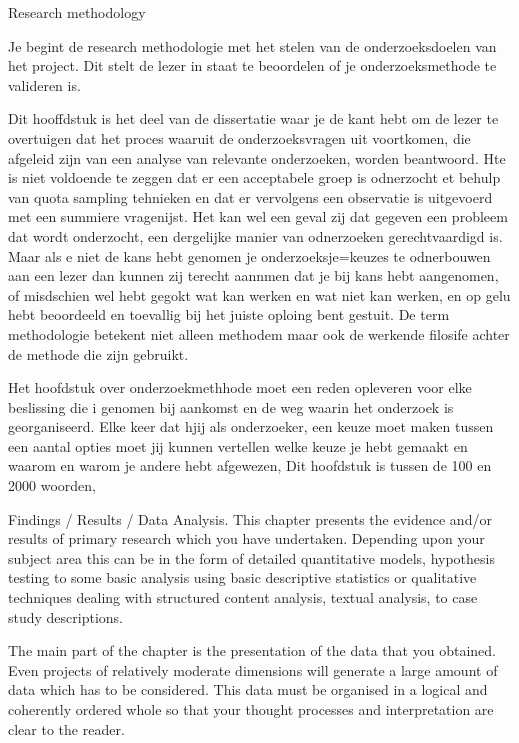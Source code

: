 			
			
			Research methodology
			
			Je begint de research methodologie met het stelen van de onderzoeksdoelen van het project. Dit stelt de lezer in staat te beoordelen of je onderzoeksmethode te valideren is.
			
			Dit hooffdstuk is het deel van de dissertatie waar je de kant hebt om de lezer te overtuigen dat het proces waaruit de onderzoeksvragen uit voortkomen, die afgeleid zijn van een analyse van relevante onderzoeken, worden beantwoord. Hte is niet voldoende te zeggen dat er een acceptabele groep is odnerzocht et behulp van quota sampling tehnieken en dat er vervolgens een observatie is uitgevoerd met een summiere vragenijst. Het kan wel een geval zij  dat gegeven een probleem dat wordt onderzocht, een dergelijke manier van odnerzoeken gerechtvaardigd is. Maar als e niet de kans hebt genomen je onderzoeksje=keuzes te odnerbouwen aan een lezer dan kunnen zij terecht aannmen dat je bij kans hebt aangenomen, of misdschien wel hebt gegokt wat kan werken en wat niet kan werken, en op gelu hebt beoordeeld en toevallig bij het juiste oploing bent gestuit.
			De term methodologie  betekent niet alleen methodem maar ook de werkende filosife achter de methode die zijn gebruikt.
			
			
			Het hoofdstuk over onderzoekmethhode moet een reden opleveren voor elke beslissing die i genomen bij aankomst en de weg waarin het onderzoek is georganiseerd. Elke keer dat hjij als onderzoeker, een keuze moet maken tussen een aantal opties moet  jij kunnen vertellen welke keuze je hebt gemaakt en waarom en warom je andere hebt afgewezen, Dit hoofdstuk is tussen de 100 en 2000 woorden,
			
			
			Findings / Results / Data Analysis.
			This chapter presents the evidence and/or results of primary research which you have undertaken. Depending upon your subject area this can be in the form of detailed quantitative models, hypothesis testing to some basic analysis using basic descriptive statistics or qualitative techniques dealing with structured content analysis, textual analysis, to case study descriptions.
			
			The main part of the chapter is the presentation of the data that you obtained. Even projects of relatively moderate dimensions will generate a large amount of data which has to be considered. This data must be organised in a logical and coherently ordered whole so that your thought processes and interpretation are clear to the reader.
			
